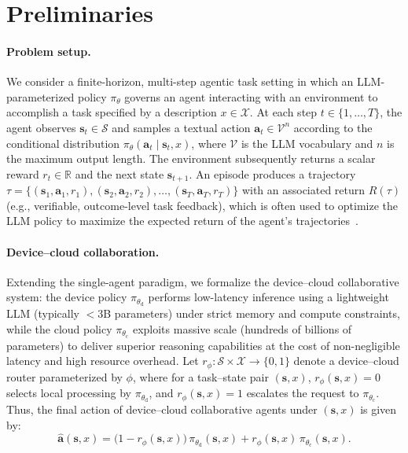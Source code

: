 \documentclass{article}
\begin{document}

\section{Preliminaries}
\label{sec:preliminary}

\paragraph{Problem setup.}
We consider a finite-horizon, multi-step agentic task setting in which an LLM-parameterized policy $\pi_\theta$ governs an agent interacting with an environment to accomplish a task specified by a description $x \in \mathcal{X}$.
At each step \(t \in \{1,\dots,T\}\), the agent observes \(\mathbf{s}_t \in \mathcal{S}\) and samples a textual action \(\mathbf{a}_t \in \mathcal{V}^{n}\) according to the conditional distribution \(\pi_\theta(\mathbf{a}_t \mid \mathbf{s}_t , x)\), where $\mathcal{V}$ is the LLM vocabulary and $n$ is the maximum output length.
The environment subsequently returns a scalar reward $r_t \in \mathbb{R}$ and the next state $\mathbf{s}_{t+1}$.
An episode produces a trajectory \(\tau = \{(\mathbf{s}_1, \mathbf{a}_1 ,r_1), (\mathbf{s}_2, \mathbf{a}_2 ,r_2),\dots, (\mathbf{s}_T, \mathbf{a}_T ,r_T)\}\) with an associated return \(R(\tau)\) (e.g., verifiable, outcome-level task feedback), which is often used to optimize the LLM policy to maximize the expected return of the agent’s trajectories~\citep{schulman2017ppo,shao2024deepseekmath}.

\paragraph{Device--cloud collaboration.}
Extending the single-agent paradigm, we formalize the device--cloud collaborative system: the device policy $\pi_{\theta_\mathrm{d}}$ performs low-latency inference using a lightweight LLM (typically $<$3B parameters) under strict memory and compute constraints, while the cloud policy $\pi_{\theta_\mathrm{c}}$ exploits massive scale (hundreds of billions of parameters) to deliver superior reasoning capabilities at the cost of non-negligible latency and high resource overhead.
Let $r_\phi : \mathcal{S} \times \mathcal{X} \rightarrow \{0,1\}$ denote a device--cloud router parameterized by $\phi$, where for a task--state pair $(\mathbf{s},x)$, $r_\phi(\mathbf{s},x)=0$ selects local processing by $\pi_{\theta_\mathrm{d}}$, and $r_\phi(\mathbf{s},x)=1$ escalates the request to $\pi_{\theta_\mathrm{c}}$.
Thus, the final action of device--cloud collaborative agents under $(\mathbf{s},x)$ is given by:
\begin{equation}
\hat{\mathbf{a}}(\mathbf{s},x)
=
\big(1 - r_\phi(\mathbf{s},x)\big)\,\pi_{\theta_\mathrm{d}}(\mathbf{s},x)
+
r_\phi(\mathbf{s},x)\,\pi_{\theta_\mathrm{c}}(\mathbf{s},x).
\end{equation}
\end{document}
